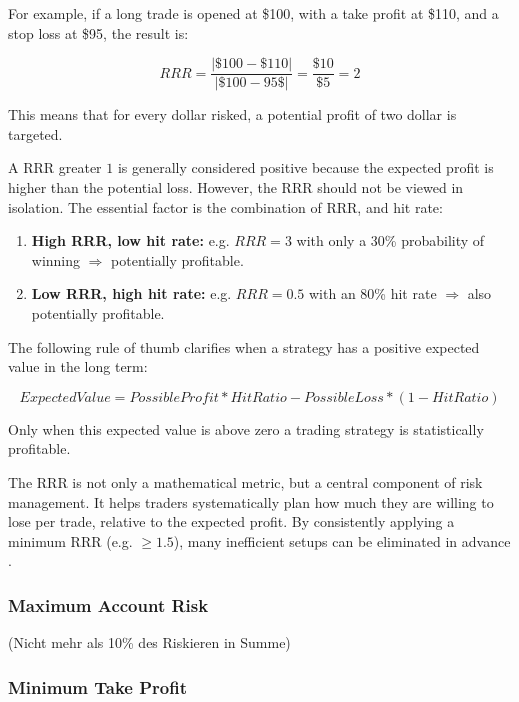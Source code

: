 For example, if a long trade is opened at \$100, with a take profit at \$110, and a stop loss at \$95, the result is:

\begin{equation}
    RRR = \frac{|\$100 - \$110|}{|\$100 - 95\$|} = \frac{\$10}{\$5} = 2
\end{equation}

This means that for every dollar risked, a potential profit of two dollar is targeted.

A RRR greater $1$ is generally considered positive because the expected profit is higher than the potential loss.
However, the RRR should not be viewed in isolation.
The essential factor is the combination of RRR, and hit rate:

\begin{enumerate}
    \item \textbf{High RRR, low hit rate:} e.g.
    $RRR=3$ with only a 30\% probability of winning $\Rightarrow$ potentially profitable.
    \item \textbf{Low RRR, high hit rate:} e.g.
    $RRR=0.5$ with an 80\% hit rate $\Rightarrow$ also potentially profitable.
\end{enumerate}

The following rule of thumb clarifies when a strategy has a positive expected value in the long term:

\begin{equation}
    ExpectedValue = PossibleProfit * HitRatio - PossibleLoss * (1 - HitRatio)
\end{equation}

Only when this expected value is above zero a trading strategy is statistically profitable.

The RRR is not only a mathematical metric, but a central component of risk management.
It helps traders systematically plan how much they are willing to lose per trade, relative to the expected profit.
By consistently applying a minimum RRR (e.g.
$\ge 1.5$), many inefficient setups can be eliminated in advance \cite{bitpanda-crv}.

\subsubsection{Maximum Account Risk}

(Nicht mehr als 10\% des Riskieren in Summe)

\subsubsection{Minimum Take Profit}


